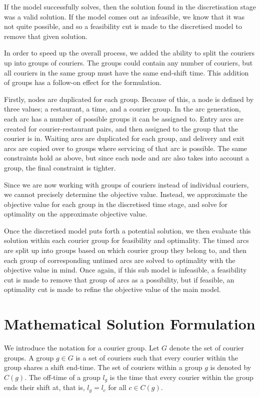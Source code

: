 \documentclass{article}
\begin{document}
If the model successfully solves, then the solution found in the discretisation stage was a valid solution. If the model comes out as infeasible, we know that it was not quite possible, and so a feasibility cut is made to the discretised model to remove that given solution.

In order to speed up the overall process, we added the ability to split the couriers up into groups of couriers. The groups could contain any number of couriers, but all couriers in the same group must have the same end-shift time. This addition of groups has a follow-on effect for the formulation.

Firstly, nodes are duplicated for each group. Because of this, a node is defined by three values; a restaurant, a time, and a courier group. In the arc generation, each arc has a number of possible groups it can be assigned to. Entry arcs are created for courier-restaurant pairs, and then assigned to the group that the courier is in. Waiting arcs are duplicated for each group, and delivery and exit arcs are copied over to groups where servicing of that arc is possible. The same constraints hold as above, but since each node and arc also takes into account a group, the final constraint is tighter.

Since we are now working with groups of couriers instead of individual couriers, we cannot precisely determine the objective value. Instead, we approximate the objective value for each group in the discretised time stage, and solve for optimality on the approximate objective value.

Once the discretised model puts forth a potential solution, we then evaluate this solution within each courier group for feasibility and optimality. The timed arcs are split up into groups based on which courier group they belong to, and then each group of corresponding untimed arcs are solved to optimality with the objective value in mind. Once again, if this sub model is infeasible, a feasibility cut is made to remove that group of arcs as a possibility, but if feasible, an optimality cut is made to refine the objective value of the main model.

\section{Mathematical Solution Formulation}

We introduce the notation for a courier group. Let $G$ denote the set of courier groups. A group $g\in G$ is a set of couriers such that every courier within the group shares a shift end-time. The set of couriers within a group $g$ is denoted by $C(g)$. The off-time of a group $l_g$ is the time that every courier within the group ends their shift at, that is, $l_g=l_c$ for all $c\in C(g)$.
\end{document}
